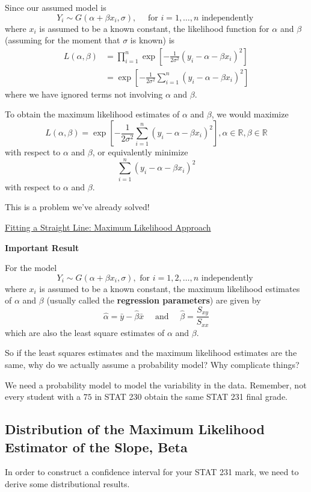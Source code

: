 Since our assumed model is
\[Y_{i} \sim G\left(\alpha+\beta x_{i}, \sigma\right), \quad \text { for } i=1, \ldots, n \text { independently }\]
where $ x_i $ is assumed to be a known constant, the likelihood function for $ \alpha $
and $ \beta $ (assuming for the moment that $ \sigma $ is known) is
\[\begin{aligned}
        L(\alpha, \beta)
         & =\prod_{i=1}^{n} \exp \left[-\frac{1}{2 \sigma^{2}}\left(y_{i}-\alpha-\beta x_{i}\right)^{2}\right] \\
         & =\exp \left[-\frac{1}{2 \sigma^{2}} \sum_{i=1}^{n}\left(y_{i}-\alpha-\beta x_{i}\right)^{2}\right]
    \end{aligned}
\]
where we have ignored terms not involving $ \alpha $ and $ \beta $.

To obtain the maximum likelihood estimates of $ \alpha $ and $ \beta $,
we would maximize
\[L(\alpha, \beta)=\exp \left[-\frac{1}{2 \sigma^{2}} \sum_{i=1}^{n}\left(y_{i}-\alpha-\beta x_{i}\right)^{2}\right],
    \alpha \in \mathbb{R}, \beta \in \mathbb{R}\]
with respect to $ \alpha $ and $ \beta $, or equivalently minimize
\[\sum_{i=1}^{n}\left(y_{i}-\alpha-\beta x_{i}\right)^{2}\]
with respect to $ \alpha $ and $ \beta $.

This is a problem we've already solved!

\underline{Fitting a Straight Line: Maximum Likelihood Approach}

\textbf{Important Result}

For the model
\[Y_{i} \sim G\left(\alpha+\beta x_{i}, \sigma\right),
    \text { for } i=1,2, \ldots, n \text { independently }\]
where $ x_i $ is assumed to be a known constant, the maximum likelihood estimates of $ \alpha $
and $ \beta $ (usually called the \textbf{regression parameters}) are given by
\[\hat{\alpha}=\bar{y}-\hat{\beta} \bar{x} \quad \text { and } \quad \hat{\beta}=\frac{S_{x y}}{S_{x x}}\]
which are also the least square estimates of $ \alpha $ and $ \beta $.

So if the least squares estimates and the maximum likelihood estimates are the same,
why do we actually assume a probability model? Why complicate things?

We need a probability model to model the variability in the data. Remember,
not every student with a $ 75 $ in STAT 230 obtain the same STAT 231 final grade.

\subsection{Distribution of the Maximum Likelihood Estimator of the Slope, Beta}
In order to construct a confidence interval for your STAT 231 mark, we need to derive
some distributional results.

